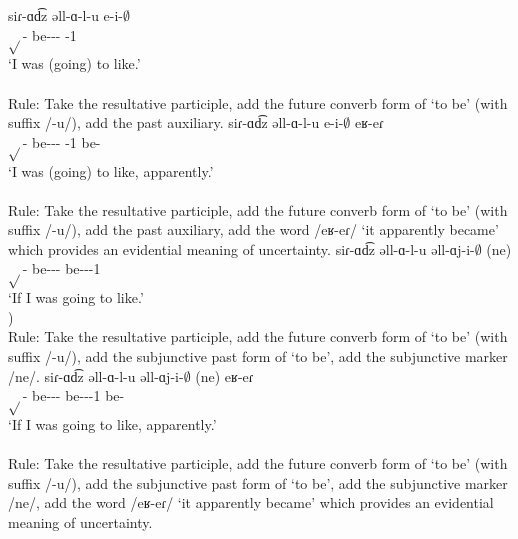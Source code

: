 \begin{exe}
\begin{xlist}
		\ex \gll siɾ-ɑd͡z əll-ɑ-l-u e-i-$\emptyset$ \\
		$\sqrt{}$-{\rptcp} be-{\thgloss}-{\infgloss}-{\futcvb} {\aux}-1{\sg} \\
		\trans `I was (going) to like.' \\
		 \\
		Rule: Take the resultative participle, add the future converb form of `to be' (with suffix /-u/), add the past auxiliary. 
		\ex \gll siɾ-ɑd͡z əll-ɑ-l-u e-i-$\emptyset$ eʁ-eɾ \\
		$\sqrt{}$-{\rptcp} be-{\thgloss}-{\infgloss}-{\futcvb} {\aux}-1{\sg} be-{\eptcp} \\
		\trans `I was (going) to like, apparently.' \\
		 \\
		Rule: Take the resultative participle, add the future converb form of `to be' (with suffix /-u/), add the past auxiliary, add the word /eʁ-eɾ/ `it apparently became' which provides an evidential meaning of uncertainty. 
		\ex \gll siɾ-ɑd͡z əll-ɑ-l-u əll-ɑj-i-$\emptyset$ (ne) \\
		$\sqrt{}$-{\rptcp} be-{\thgloss}-{\infgloss}-{\futcvb} be-{\thgloss}-{\pst}-1{\sg} {\sbjv} \\
		\trans `If I was going to like.' \\
		) \\
		Rule: Take the resultative participle, add the future converb form of `to be' (with suffix /-u/), add the subjunctive past form of `to be', add the subjunctive marker /ne/. 
		\ex \gll siɾ-ɑd͡z əll-ɑ-l-u əll-ɑj-i-$\emptyset$ (ne) eʁ-eɾ \\
		$\sqrt{}$-{\rptcp} be-{\thgloss}-{\infgloss}-{\futcvb} be-{\thgloss}-{\pst}-1{\sg} {\sbjv} be-{\eptcp} \\
		\trans `If I was going to like, apparently.' \\
		 \\ 
		Rule: Take the resultative participle, add the future converb form of `to be' (with suffix /-u/), add the subjunctive past form of `to be', add the subjunctive marker /ne/, add the word /eʁ-eɾ/ `it apparently became' which provides an evidential meaning of uncertainty. 
		
	\end{xlist}
\end{exe}




